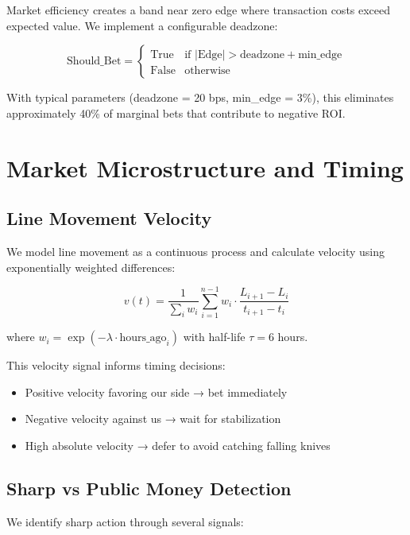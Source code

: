Market efficiency creates a band near zero edge where transaction costs exceed expected value. We implement a configurable deadzone:

\begin{equation}
\text{Should\_Bet} = \begin{cases}
\text{True} & \text{if } |\text{Edge}| > \text{deadzone} + \text{min\_edge} \\
\text{False} & \text{otherwise}
\end{cases}
\end{equation}

With typical parameters (deadzone = 20 bps, min\_edge = 3\%), this eliminates approximately 40\% of marginal bets that contribute to negative ROI.

\section{Market Microstructure and Timing}

\subsection{Line Movement Velocity}

We model line movement as a continuous process and calculate velocity using exponentially weighted differences:

\begin{equation}
v(t) = \frac{1}{\sum_i w_i} \sum_{i=1}^{n-1} w_i \cdot \frac{L_{i+1} - L_i}{t_{i+1} - t_i}
\end{equation}

where $w_i = \exp(-\lambda \cdot \text{hours\_ago}_i)$ with half-life $\tau = 6$ hours.

This velocity signal informs timing decisions:
\begin{itemize}
  \item Positive velocity favoring our side → bet immediately
  \item Negative velocity against us → wait for stabilization
  \item High absolute velocity → defer to avoid catching falling knives
\end{itemize}

\subsection{Sharp vs Public Money Detection}

We identify sharp action through several signals:

